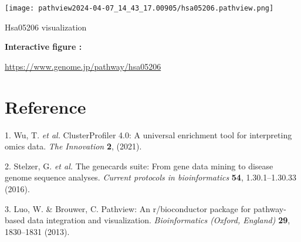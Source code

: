 \documentclass[
]{article}
\newenvironment{cslreferences}%
  {}%
  {\par}
\begin{document}
\def\@captype{figure}
\begin{center}
\texttt{[image: pathview2024-04-07\_14\_43\_17.00905/hsa05206.pathview.png]}
\caption{Hsa05206 visualization}\label{fig:Hsa05206-visualization}
\end{center}
\begin{center}\begin{tcolorbox}[colback=gray!10, colframe=gray!50, width=0.9\linewidth, arc=1mm, boxrule=0.5pt]
\textbf{
Interactive figure
:}

\vspace{0.5em}

    \url{https://www.genome.jp/pathway/hsa05206}

\vspace{2em}
\end{tcolorbox}
\end{center}

\hypertarget{bibliography}{%
\section*{Reference}\label{bibliography}}

\hypertarget{refs}{}
\begin{cslreferences}
\leavevmode\hypertarget{ref-ClusterprofilerWuTi2021}{}%
1. Wu, T. \emph{et al.} ClusterProfiler 4.0: A universal enrichment tool for interpreting omics data. \emph{The Innovation} \textbf{2}, (2021).

\leavevmode\hypertarget{ref-TheGenecardsSStelze2016}{}%
2. Stelzer, G. \emph{et al.} The genecards suite: From gene data mining to disease genome sequence analyses. \emph{Current protocols in bioinformatics} \textbf{54}, 1.30.1--1.30.33 (2016).

\leavevmode\hypertarget{ref-PathviewAnRLuoW2013}{}%
3. Luo, W. \& Brouwer, C. Pathview: An r/bioconductor package for pathway-based data integration and visualization. \emph{Bioinformatics (Oxford, England)} \textbf{29}, 1830--1831 (2013).
\end{cslreferences}
\end{document}
